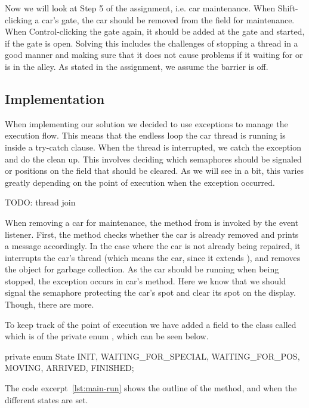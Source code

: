 
Now we will look at Step 5 of the assignment, i.e. car
maintenance. When Shift-clicking a car's gate, the car should be
removed from the field for maintenance. When Control-clicking the gate
again, it should be added at the gate and started, if the gate is
open. Solving this includes the challenges of stopping a thread in a
good manner and making sure that it does not cause problems if it
waiting for or is in the alley. As stated in the assignment, we assume
the barrier is off.


\subsection{Implementation}
\label{sub:main-moni}
When implementing our solution we decided to use exceptions to manage
the execution flow. This means that the endless loop the car thread is
running is inside a try-catch clause. When the thread is interrupted,
we catch the exception and do the clean up. This involves deciding
which semaphores should be signaled or positions on the field that
should be cleared. As we will see in a bit, this varies greatly
depending on the point of execution when the exception occurred.

TODO: thread join

When removing a car for maintenance, the  method
from  is invoked by the event listener. First, the
method checks whether the car is already removed and prints a message
accordingly. In the case where the car is not already being repaired,
it interrupts the car's thread (which means the car, since it extends
), and removes the object for garbage
collection. As the car should be running when being stopped, the
exception occurs in car's  method. Here we know that we
should signal the semaphore protecting the car's spot and clear its
spot on the display. Though, there are more.

To keep track of the point of execution we have added a field to the
 class called  which is of the private enum
, which can be seen below.

\begin{java}
private enum State {
    INIT,
    WAITING_FOR_SPECIAL,
    WAITING_FOR_POS,
    MOVING,
    ARRIVED,
    FINISHED;
}
\end{java}

The code excerpt~\ref{lst:main-run} shows the outline of the
 method, and when the different states are set.

